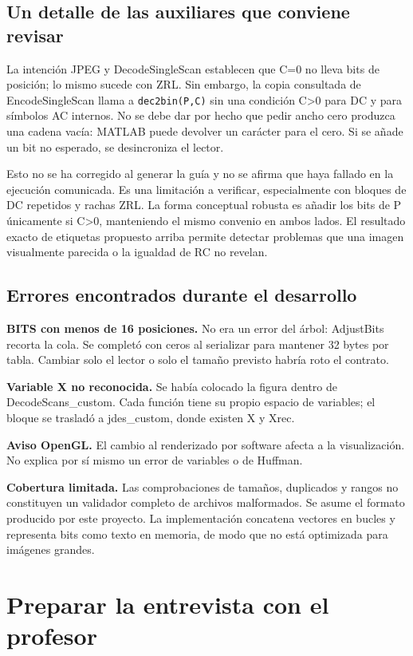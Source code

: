 \documentclass[11pt,a4paper,oneside]{report}
\begin{document}
\section{Un detalle de las auxiliares que conviene revisar}

La intención JPEG y DecodeSingleScan establecen que C=0 no lleva bits de
posición; lo mismo sucede con ZRL. Sin embargo, la copia consultada de
EncodeSingleScan llama a \texttt{dec2bin(P,C)} sin una condición C>0 para
DC y para símbolos AC internos. No se debe dar por hecho que pedir ancho
cero produzca una cadena vacía: MATLAB puede devolver un carácter para el cero.
Si se añade un bit no esperado, se desincroniza el lector.

Esto no se ha corregido al generar la guía y no se afirma que haya fallado
en la ejecución comunicada. Es una limitación a verificar, especialmente con
bloques de DC repetidos y rachas ZRL. La forma conceptual robusta es añadir
los bits de P únicamente si C>0, manteniendo el mismo convenio en ambos lados.
El resultado exacto de etiquetas propuesto arriba permite detectar problemas
que una imagen visualmente parecida o la igualdad de RC no revelan.


\section{Errores encontrados durante el desarrollo}

\textbf{BITS con menos de 16 posiciones.} No era un error del árbol: AdjustBits
recorta la cola. Se completó con ceros al serializar para mantener 32 bytes
por tabla. Cambiar solo el lector o solo el tamaño previsto habría roto el contrato.

\textbf{Variable X no reconocida.} Se había colocado la figura dentro de
DecodeScans\_custom. Cada función tiene su propio espacio de variables;
el bloque se trasladó a jdes\_custom, donde existen X y Xrec.

\textbf{Aviso OpenGL.} El cambio al renderizado por software afecta a la
visualización. No explica por sí mismo un error de variables o de Huffman.

\textbf{Cobertura limitada.} Las comprobaciones de tamaños, duplicados y rangos
no constituyen un validador completo de archivos malformados. Se asume el
formato producido por este proyecto. La implementación concatena vectores
en bucles y representa bits como texto en memoria, de modo que no está
optimizada para imágenes grandes.


\chapter{Preparar la entrevista con el profesor}
\end{document}
